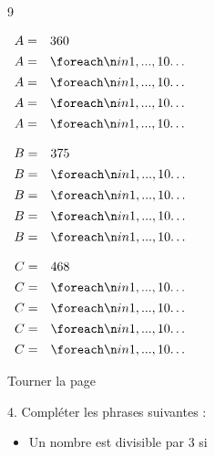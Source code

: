 \documentclass[a4paper]{book}
\begin{document}
{\begin{exerciceNote}{9}
\begin{enumerate}[leftmargin=*]
            \begin{minipage}{0.30\linewidth}
                $\begin{array}{ll}
                    A = & 360 \\[1ex]
                    A = & \points[10]\\[1ex]
                    A = & \points[10]\\[1ex]
                    A = & \points[10]\\[1ex]
                    A = & \points[10]
                \end{array}$
    
            \end{minipage}
            \hfill
            \begin{minipage}{0.30\linewidth}
                $\begin{array}{ll}
                    B = & 375 \\[1ex]
                    B = & \points[10] \\[1ex]
                    B = & \points[10] \\[1ex]
                    B = & \points[10] \\[1ex]
                    B = & \points[10] 
                \end{array}$    
            \end{minipage}
            \hfill
            \begin{minipage}[t]{0.30\linewidth}
                $\begin{array}{ll}
                    C = & 468 \\[1ex]
                    C = & \points[10] \\[1ex]
                    C = & \points[10] \\[1ex]
                    C = & \points[10] \\[1ex]
                    C = & \points[10] 
                \end{array}$
            \end{minipage}
        \end{enumerate}
    \end{exerciceNote}

    \vfill\hfill Tourner la page

    \begin{exercice}
        4. Compléter les phrases suivantes :
        \begin{itemize}
            \item Un nombre est divisible par 3 si \dotfill


\end{itemize}
\end{exercice}}
\end{document}

